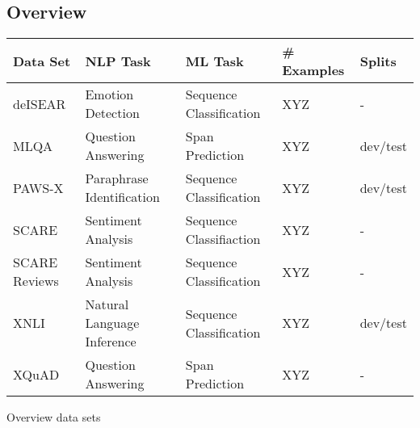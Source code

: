 \cite{artetxe2019cross}

\subsection{Overview}

{\begin{tabular}{l|llll}
	Data Set & NLP Task  & ML Task  & \# Examples & Splits \\
	\hline
	deISEAR &  Emotion Detection & Sequence Classification  & XYZ & - \\
	MLQA & Question Answering & Span Prediction & XYZ & dev/test \\
	PAWS-X & Paraphrase Identification & Sequence Classification & XYZ & dev/test \\
	SCARE & Sentiment Analysis & Sequence Classifiaction & XYZ & - \\
	SCARE Reviews &  Sentiment Analysis & Sequence Classification & XYZ & - \\
	XNLI & Natural Language Inference & Sequence Classification &  XYZ & dev/test \\
	XQuAD & Question Answering & Span Prediction & XYZ & - \\
\end{tabular}
}{Overview data sets}

